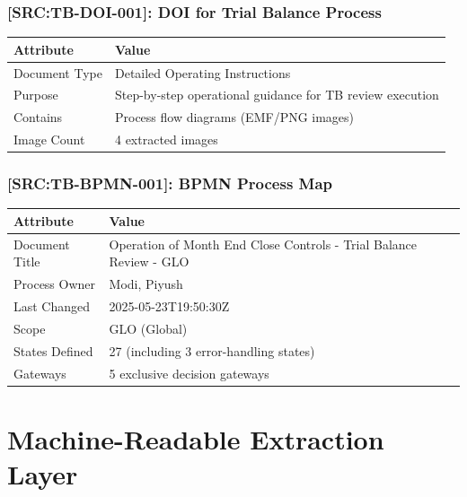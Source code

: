 \documentclass[11pt,a4paper]{article}
\newcommand{\srcref}[1]{\textcolor{sourcegreen}{\textbf{[SRC:#1]}}}
\begin{document}
\subsubsection{\srcref{TB-DOI-001}: DOI for Trial Balance Process}

\begin{table}[h]
\centering
\begin{tabular}{@{}L{4cm}L{10cm}@{}}
\toprule
\textbf{Attribute} & \textbf{Value} \\
\midrule
Document Type & Detailed Operating Instructions \\
Purpose & Step-by-step operational guidance for TB review execution \\
Contains & Process flow diagrams (EMF/PNG images) \\
Image Count & 4 extracted images \\
\bottomrule
\end{tabular}
\end{table}

\subsubsection{\srcref{TB-BPMN-001}: BPMN Process Map}

\begin{table}[h]
\centering
\begin{tabular}{@{}L{4cm}L{10cm}@{}}
\toprule
\textbf{Attribute} & \textbf{Value} \\
\midrule
Document Title & Operation of Month End Close Controls - Trial Balance Review - GLO \\
Process Owner & Modi, Piyush \\
Last Changed & 2025-05-23T19:50:30Z \\
Scope & GLO (Global) \\
States Defined & 27 (including 3 error-handling states) \\
Gateways & 5 exclusive decision gateways \\
\bottomrule
\end{tabular}
\end{table}


\newpage
\section{Machine-Readable Extraction Layer}
\end{document}
